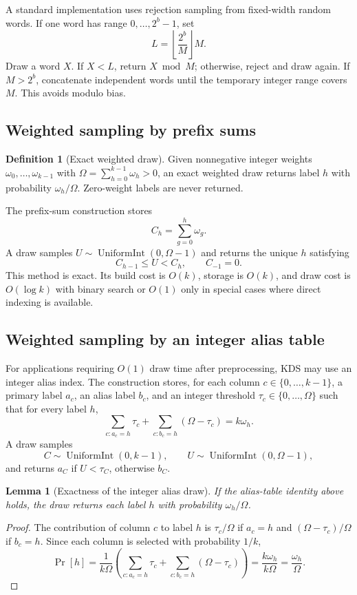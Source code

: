 \documentclass[11pt]{article}
\theoremstyle{definition}
\newtheorem{definition}{Definition}[section]
\theoremstyle{plain}
\newtheorem{lemma}{Lemma}[section]
\theoremstyle{remark}
\DeclareMathOperator{\UniformInt}{UniformInt}
\begin{document}
A standard implementation uses rejection sampling from fixed-width random words.  If one
word has range $0,\ldots,2^b-1$, set
\[
  L = \left\lfloor\frac{2^b}{M}\right\rfloor M.
\]
Draw a word $X$.  If $X<L$, return $X\bmod M$; otherwise, reject and draw again.  If
$M>2^b$, concatenate independent words until the temporary integer range covers $M$.  This
avoids modulo bias.

\subsection{Weighted sampling by prefix sums}

\begin{definition}[Exact weighted draw]
Given nonnegative integer weights
$\omega_0,\ldots,\omega_{k-1}$ with
$\Omega=\sum_{h=0}^{k-1}\omega_h>0$, an exact weighted draw returns label $h$ with
probability $\omega_h/\Omega$.  Zero-weight labels are never returned.
\end{definition}

The prefix-sum construction stores
\[
  C_h=\sum_{g=0}^{h}\omega_g.
\]
A draw samples $U\sim\UniformInt(0,\Omega-1)$ and returns the unique $h$ satisfying
\[
  C_{h-1}\le U<C_h,
  \qquad C_{-1}=0.
\]
This method is exact.  Its build cost is $O(k)$, storage is $O(k)$, and draw cost is
$O(\log k)$ with binary search or $O(1)$ only in special cases where direct indexing is
available.

\subsection{Weighted sampling by an integer alias table}

For applications requiring $O(1)$ draw time after preprocessing, KDS may use an integer alias
index.  The construction stores, for each column $c\in\{0,\ldots,k-1\}$, a primary label
$a_c$, an alias label $b_c$, and an integer threshold $\tau_c\in\{0,\ldots,\Omega\}$ such
that for every label $h$,
\[
  \sum_{c:a_c=h}\tau_c + \sum_{c:b_c=h}(\Omega-\tau_c) = k\omega_h.
\]
A draw samples
\[
  C\sim\UniformInt(0,k-1),
  \qquad
  U\sim\UniformInt(0,\Omega-1),
\]
and returns $a_C$ if $U<\tau_C$, otherwise $b_C$.

\begin{lemma}[Exactness of the integer alias draw]
If the alias-table identity above holds, the draw returns each label $h$ with probability
$\omega_h/\Omega$.
\end{lemma}

\begin{proof}
The contribution of column $c$ to label $h$ is $\tau_c/\Omega$ if $a_c=h$ and
$(\Omega-\tau_c)/\Omega$ if $b_c=h$.  Since each column is selected with probability $1/k$,
\[
  \Pr[h]
  = \frac{1}{k\Omega}
      \left(
        \sum_{c:a_c=h}\tau_c
        +
        \sum_{c:b_c=h}(\Omega-\tau_c)
      \right)
  = \frac{k\omega_h}{k\Omega}
  = \frac{\omega_h}{\Omega}.
\]
\end{proof}
\end{document}
